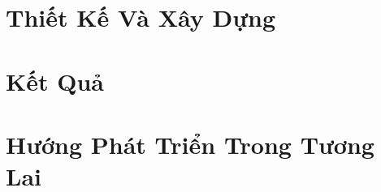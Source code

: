 \documentclass[14pt]{hcmutarticle}
\begin{document}
\chapter{Thiết Kế Và Xây Dựng}


\chapter{Kết Quả}


\chapter{Hướng Phát Triển Trong Tương Lai}


\newpage


\newpage


\newpage


\newpage

\end{document}
